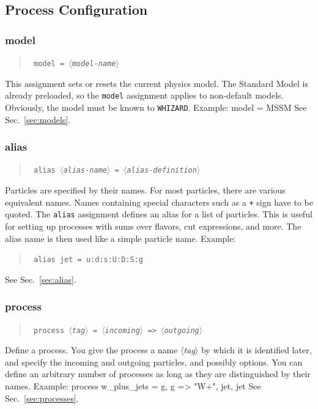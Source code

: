 \documentclass[12pt]{book}
\newenvironment{code}%
  {\begingroup\footnotesize
   \quote
   \Verbatim}%
  {\endVerbatim
   \endquote
   \endgroup\noindent}
\newenvironment{syntax}%
  {\begin{quote}
   \begin{flushleft}\tt}%
  {\end{flushleft}
   \end{quote}}
\newcommand{\var}[1]{$\langle$\textit{#1}$\rangle$}
\newcommand{\ttt}[1]{\texttt{#1}}
\newcommand{\whizard}{\ttt{WHIZARD}}
\begin{document}
\subsection{Process Configuration}

\subsubsection{model}
\begin{syntax}
model = \var{model-name}
\end{syntax}
This assignment sets or resets the current physics model.  The
Standard Model is already preloaded, so the \ttt{model} assignment
applies to non-default models.  Obviously, the model must be known to
\whizard. Example:
\begin{code}
model = MSSM
\end{code}
See Sec.~\ref{sec:models}.

\subsubsection{alias}
\begin{syntax}
alias \var{alias-name} = \var{alias-definition}
\end{syntax}
Particles are specified by their names.   For most particles, there
are various equivalent names.  Names containing special characters
such as a \verb|+| sign have to be quoted.  The \ttt{alias} assignment
defines an alias for a list of particles.  This is useful for setting
up processes with sums over flavors, cut expressions, and more.  The
alias name is then used like a simple particle name.  Example:
\begin{syntax}
alias jet = u:d:s:U:D:S:g
\end{syntax}
See Sec.~\ref{sec:alias}.


\subsubsection{process}
\begin{syntax}
process \var{tag} = \var{incoming} \verb|=>| \var{outgoing}
\end{syntax}
Define a process.  You give the process a name \var{tag} by which it is
identified later, and specify the incoming and outgoing particles,
and possibly options.  You can define an arbitrary number of processes
as long as they are distinguished by their names.  Example:
\begin{code}
process w_plus_jets = g, g => "W+", jet, jet
\end{code}
See Sec.~\ref{sec:processes}.
\end{document}
